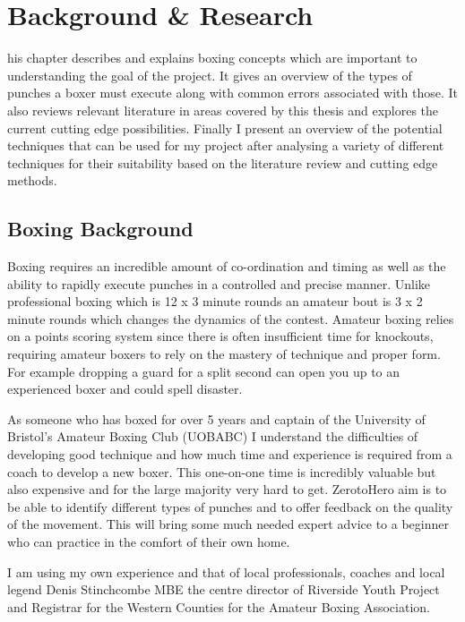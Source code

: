 %
%
\let\textcircled=\pgftextcircled
\chapter{Background \& Research}
\label{chap:intro}

his chapter describes and explains boxing concepts which are important to understanding the goal of the project. It gives an overview of the types of punches a boxer must execute along with common errors associated with those. It also reviews relevant literature in areas covered by this thesis and explores the current cutting edge possibilities. Finally I present an overview of the potential techniques that can be used for my project after analysing a variety of different techniques for their suitability based on the literature review and cutting edge methods.

\section{Boxing Background}
\label{sec:sec01}
Boxing requires an incredible amount of co-ordination and timing as well as the ability to rapidly execute punches in a controlled and precise manner. Unlike professional boxing which is 12 x 3 minute rounds an amateur bout is 3 x 2 minute rounds which changes the dynamics of the contest. Amateur boxing relies on a points scoring system since there is often insufficient time for knockouts, requiring amateur boxers to rely on the mastery of technique and proper form. For example dropping a guard for a split second can open you up to an experienced boxer and could spell disaster.

As someone who has boxed for over 5 years and captain of the University of Bristol's Amateur Boxing Club (UOBABC) I understand the difficulties of developing good technique and how much time and experience is required from a coach to develop a new boxer. This one-on-one time is incredibly valuable but also expensive and for the large majority very hard to get. ZerotoHero aim is to be able to identify different types of punches and to offer feedback on the quality of the movement. This will bring some much needed expert advice to a beginner who can practice in the comfort of their own home.

I am using my own experience and that of local professionals, coaches and local legend Denis Stinchcombe MBE the centre director of Riverside Youth Project and Registrar for the Western Counties for the Amateur Boxing Association.
 

